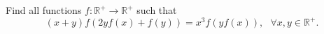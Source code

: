 Find all functions $f: \mathbb{R}^{+} \rightarrow \mathbb{R}^{+}$ such that $$
(x+y)f(2yf(x)+f(y))=x^{3}f(yf(x)),  \ \ \ \forall x,y\in \mathbb{R}^{+}.$$
